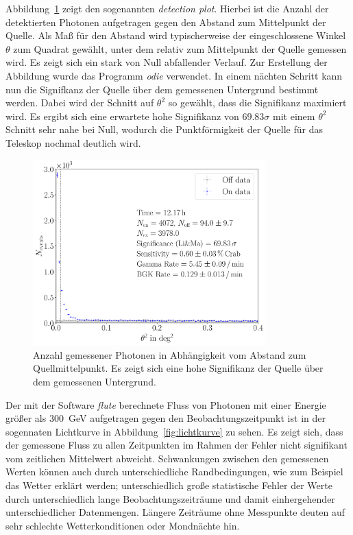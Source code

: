 Abbildung~\ref{fig:detectionplot} zeigt den sogenannten \textit{detection plot}.
Hierbei ist die Anzahl der detektierten Photonen aufgetragen gegen den Abstand
zum Mittelpunkt der Quelle. Als Maß für den Abstand wird typischerweise
der eingeschlossene Winkel $\theta$ zum Quadrat gewählt, unter dem relativ zum
Mittelpunkt der Quelle gemessen wird. Es zeigt sich ein stark von Null
abfallender Verlauf. Zur Erstellung der Abbildung wurde das Programm
\textit{odie} verwendet. In einem nächten Schritt kann nun die Signifkanz der
Quelle über dem gemessenen Untergrund bestimmt werden. Dabei wird der Schnitt
auf $\theta^2$ so gewählt, dass die Signifikanz maximiert wird. Es ergibt sich
eine erwartete hohe Signifikanz von $\num{69.83}\sigma$ mit einem $\theta^2$
Schnitt sehr nahe bei Null, wodurch die Punktförmigkeit der Quelle für das
Teleskop nochmal deutlich wird.

\begin{figure}
  \centering
  \includegraphics[width=0.8\textwidth]{figures/odie_thetasquared.pdf}
  \caption{Anzahl gemessener Photonen in Abhängigkeit vom Abstand zum
  Quellmittelpunkt. Es zeigt sich eine hohe Signifikanz der Quelle über dem
  gemessenen Untergrund.}
  \label{fig:detectionplot}
\end{figure}

Der mit der Software \textit{flute} berechnete Fluss von Photonen mit einer
Energie größer als \SI{300}{\giga\electronvolt} aufgetragen gegen den
Beobachtungszeitpunkt ist in der sogennaten Lichtkurve in
Abbildung~\ref{fig:lichtkurve} zu sehen. Es zeigt sich, dass der gemessene Fluss
zu allen Zeitpunkten im Rahmen der Fehler nicht signifikant vom zeitlichen
Mittelwert abweicht. Schwankungen zwischen den gemessenen Werten können
auch durch unterschiedliche Randbedingungen, wie zum Beispiel das Wetter erklärt
werden; unterschiedlich große statistische Fehler der Werte durch
unterschiedlich lange Beobachtungszeiträume und damit einhergehender
unterschiedlicher Datenmengen. Längere Zeiträume ohne Messpunkte deuten auf
sehr schlechte Wetterkonditionen oder Mondnächte hin.

